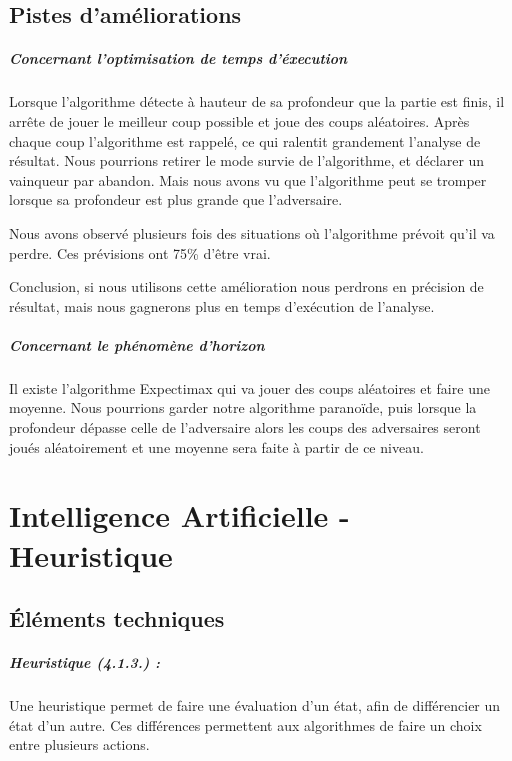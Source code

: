 	\section{Pistes d'améliorations}
	\paragraph{Concernant l'optimisation de temps d'éxecution}
	Lorsque l'algorithme détecte à hauteur de sa profondeur que la 
	partie est finis, il arrête de jouer le meilleur coup possible et joue des
	coups aléatoires. Après chaque coup l'algorithme est rappelé, ce qui
	ralentit grandement l'analyse de résultat. Nous pourrions retirer le mode
	survie de l'algorithme, et déclarer un vainqueur par abandon. Mais nous
	avons vu que l'algorithme peut se tromper lorsque sa profondeur est plus
	grande que l'adversaire.
	
	Nous avons observé plusieurs fois des situations où l'algorithme
	prévoit qu'il va perdre. Ces prévisions ont 75\% d'être vrai.
	
	Conclusion, si nous utilisons cette amélioration nous perdrons en
	précision de résultat, mais nous gagnerons plus en temps d'exécution de
	l'analyse.
	
	\paragraph{Concernant le phénomène d'horizon}
	Il existe l'algorithme Expectimax qui va jouer des coups aléatoires et
	faire une moyenne. Nous pourrions garder notre algorithme paranoïde, puis
	lorsque la profondeur dépasse celle de l'adversaire alors les coups des
	adversaires seront joués aléatoirement et une moyenne sera faite à partir de
	ce niveau. 


\chapter{Intelligence Artificielle - Heuristique}

\section{Éléments techniques}

\paragraph{Heuristique (4.1.3.) :}
Une heuristique permet de faire une évaluation d'un état, afin de
différencier un état d'un autre. Ces différences permettent aux
algorithmes de faire un choix entre plusieurs actions.

